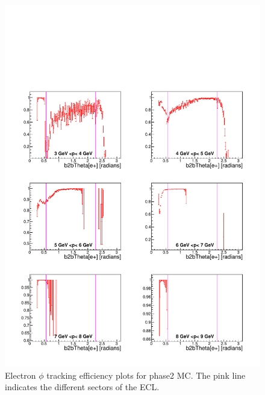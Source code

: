 \documentclass[a4paper,11pt,twosided,final,german,openbib,pdftex,listof=totoc,bibliography=totoc]{scrbook}
\begin{document}
\begin{appendix}
\begin{figure}[!htbp]
	\centering
	\includegraphics[width=\textwidth]{Plots/master/xPMThetaem_MC}
	\caption[Momentum $\theta$ Electron Efficiency Phase2 MC]{Electron $\phi$ tracking efficiency plots for phase2 MC. The pink line indicates the different sectors of the ECL.}
	\label{plt:PMThetaem_MC}
\end{figure}



\end{appendix}
\end{document}
